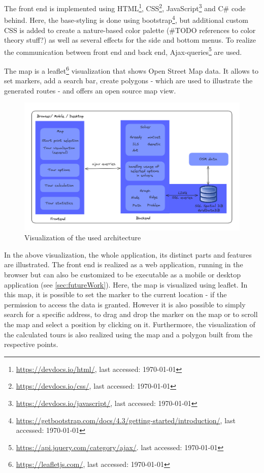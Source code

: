 The front end is implemented using HTML\footnote{\url{https://devdocs.io/html/}, last accessed: \today}, CSS\footnote{\url{https://devdocs.io/css/}, last accessed: \today}, JavaScript\footnote{\url{https://devdocs.io/javascript/}, last accessed: \today} and C\# code behind. 
Here, the base-styling is done using bootstrap\footnote{\url{https://getbootstrap.com/docs/4.3/getting-started/introduction/}, last accessed: \today}, but additional custom CSS is added to create a nature-based color palette (\#TODO references to color theory stuff?) as well as several effects for the side and bottom menus.
To realize the communication between front end and back end, Ajax-queries\footnote{\url{https://api.jquery.com/category/ajax/}. last accessed: \today} are used.

The map is a leaflet\footnote{\url{https://leafletjs.com/}, last accessed: \today} visualization that shows Open Street Map data.
It allows to set markers, add a search bar, create polygons - which are used to illustrate the generated routes - and offers an open source map view. 


\begin{figure}[H]
	\includegraphics[width=0.9\linewidth]{bilder/Implementation Architecture.png}
	\caption{Visualization of the used architecture}
	\label{fig:architecture}
\end{figure}

In the above visualization, the whole application, its distinct parts and features are illustrated. 
The front end is realized as a web application, running in the browser but can also be customized to be executable as a mobile or desktop application (see \ref{sec:futureWork}).
Here, the map is visualized using leaflet. 
In this map, it is possible to set the marker to the current location - if the permission to access the data is granted.
However it is also possible to simply search for a specific address, to drag and drop the marker on the map or to scroll the map and select a position by clicking on it. 
Furthermore, the visualization of the calculated tours is also realized using the map and a polygon built from the respective points.

